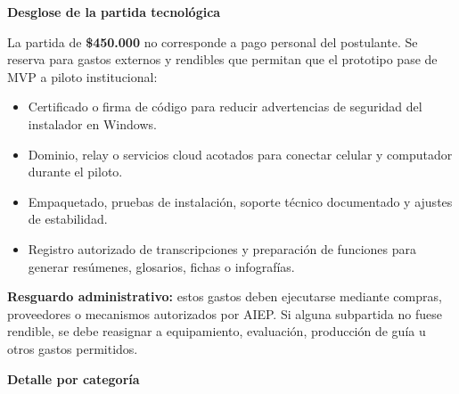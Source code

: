 \documentclass[10pt,letterpaper]{article}
\newcommand{\sectiontitle}[1]{%
  \vspace{0.55em}%
  {\bfseries\large #1}\par
  \vspace{0.12em}%
}
\newcommand{\money}[1]{\$#1}
\begin{document}
\sectiontitle{Desglose de la partida tecnológica}

La partida de \textbf{\money{450.000}} no corresponde a pago personal del postulante. Se reserva para gastos externos y rendibles que permitan que el prototipo pase de MVP a piloto institucional:

\begin{itemize}
  \item Certificado o firma de código para reducir advertencias de seguridad del instalador en Windows.
  \item Dominio, relay o servicios cloud acotados para conectar celular y computador durante el piloto.
  \item Empaquetado, pruebas de instalación, soporte técnico documentado y ajustes de estabilidad.
  \item Registro autorizado de transcripciones y preparación de funciones para generar resúmenes, glosarios, fichas o infografías.
\end{itemize}

\textbf{Resguardo administrativo:} estos gastos deben ejecutarse mediante compras, proveedores o mecanismos autorizados por AIEP. Si alguna subpartida no fuese rendible, se debe reasignar a equipamiento, evaluación, producción de guía u otros gastos permitidos.

\sectiontitle{Detalle por categoría}
\end{document}

